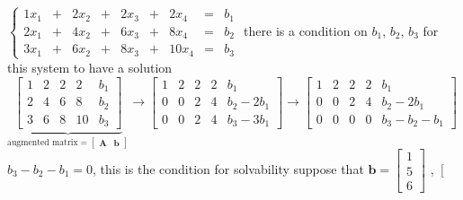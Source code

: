 \documentclass[12pt, a4paper]{article}
\begin{document}
{\noindent
\begin{math}
	\left\{  
	\begin{array}{rclrclrclrcl}
		1x_1 & + & 2x_2 & + & 2x_3 & + & 2x_4 & = & b_1 \\
		2x_1 & + & 4x_2 & + & 6x_3 & + & 8x_4 & = & b_2 \\
		3x_1 & + & 6x_2 & + & 8x_3 & + & 10x_4 & = & b_3
	\end{array}  
	\right.
\end{math}
\newline
there is a condition on $b_1$, $b_2$, $b_3$ for this system to have a solution
\vspace{14pt}
\newline
\begin{math}
	\underbrace{
		\left[
			\begin{array}{cccc|c}
				1 & 2 & 2 & 2 & b_1 \\
				2 & 4 & 6 & 8 & b_2 \\
				3 & 6 & 8 & 10 & b_3 
			\end{array}
		\right]
	}_{
		{\text{augmented matrix}} = 
		\left[
			\begin{array}{c|c}
				{\mathbf{A}} & {\mathbf{b}}
			\end{array}
		\right]
	}
	\longrightarrow
	\left[
	\begin{array}{cccc|l}
		1 & 2 & 2 & 2 & b_1 \\
		0 & 0 & 2 & 4 & b_2-2b_1 \\
		0 & 0 & 2 & 4 & b_3-3b_1 
	\end{array}
	\right]
	\longrightarrow
	\left[
	\begin{array}{cccc|l}
		1 & 2 & 2 & 2 & b_1 \\
		0 & 0 & 2 & 4 & b_2-2b_1 \\
		0 & 0 & 0 & 0 & b_3-b_2-b_1 
	\end{array}
	\right]
\end{math}
\newline
$b_3-b_2-b_1=0$, this is the condition for solvability
\newline
suppose that 
\begin{math}
	{\mathbf{b}} = 
	\begin{bmatrix}
		1 \\
		5 \\
		6 
	\end{bmatrix}
\end{math}
 , 
\newline
\begin{math}
	\left[
	\begin{array}{c|c}

\end{array}
\end{math}}
\end{document}
